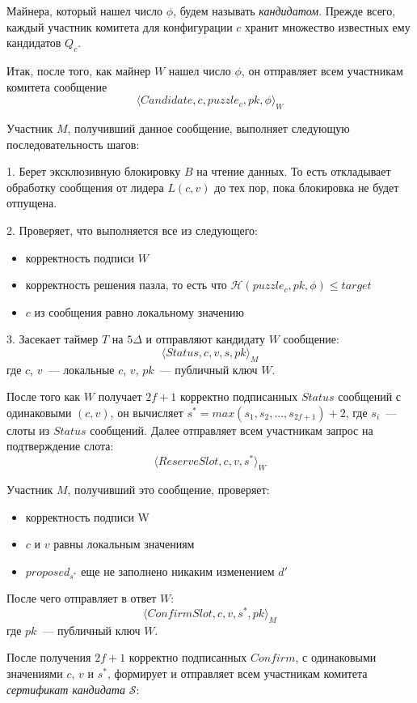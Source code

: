 Майнера, который нашел число $\phi$, будем называть \textit{кандидатом}.
Прежде всего, каждый участник комитета для конфигурации $c$ хранит множество известных ему кандидатов $Q_c$.
\vspace{10pt}

Итак, после того, как майнер $W$ нашел число $\phi$, он отправляет всем участникам комитета сообщение
 \[ \langle Candidate, c, puzzle_c, pk, \phi \rangle_W \]
 
Участник $M$, получивший данное сообщение, выполняет следующую последовательность шагов:

1. Берет эксклюзивную блокировку $B$ на чтение данных. То есть откладывает обработку сообщения от лидера $L(c, v)$ до тех пор, пока блокировка не будет отпущена. 

2. Проверяет, что выполняется все из следующего:
\begin{itemize}
\item корректность подписи $W$ 
\item корректность решения пазла, то есть что $\mathcal{H}(puzzle_c, pk, \phi) \le target$
\item $c$ из сообщения равно локальному значению
\end{itemize}

3. Засекает таймер $T$ на $5\Delta$ и отправляют кандидату $W$ сообщение:
 \[ \langle Status, c, v, s, pk \rangle_M \]
где $c$, $v$~--- локальные  $c$, $v$, $pk$~--- публичный ключ $W$.
\vspace{10pt}

После того как $W$ получает $2f+1$ корректно подписанных $Status$ сообщений с одинаковыми $(c, v)$, он вычисляет $s^{*}=max(s_1, s_2,..., s_{2f+1})+2$, где $s_i$~--- слоты из $Status$ сообщений.
Далее отправляет всем участникам запрос на подтверждение слота:
 \[ \langle ReserveSlot, c, v, s^{*} \rangle_W \]
 
\noindent Участник $M$, получивший это сообщение, проверяет:
\begin{itemize}
\item корректность подписи W
\item $c$ и $v$ равны локальным значениям
\item $proposed_{s^{*}}$ еще не заполнено никаким изменением $d'$
\end{itemize} 
После чего отправляет в ответ $W$:
 \[ \langle ConfirmSlot, c, v, s^{*}, pk \rangle_M \]
где $pk$~--- публичный ключ $W$.
\vspace{10pt}

После получения $2f+1$ корректно подписанных $Confirm$, с одинаковыми значениями $c$, $v$ и $s^{*}$,
формирует и отправляет всем участникам комитета \textit{сертификат кандидата} $\mathcal{S}$:

